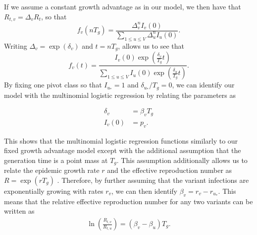 If we assume a constant growth advantage as in our model, we then have that $R_{t,v} = \Delta_{v} R_{t}$, so that
\begin{equation}
  f_{v}(nT_{g}) =  \frac{\Delta_{v}^{n} I_{v}(0)}{\sum_{1\leq u \leq V} \Delta_{u}^{n} I_{u}(0)}.
\end{equation}
Writing $\Delta_{v} = \exp(\delta_{v})$ and $t = n T_{g}$, allows us to see that
\begin{equation}
  f_{v}(t) = \frac{I_{v}(0) \exp(\frac{\delta_{v}}{T_{g}} t)}{\sum_{1\leq u \leq V}I_{u}(0) \exp(\frac{\delta_{u}}{T_{g}} t)}.
\end{equation}
By fixing one pivot class so that $I_{u_{*}} = 1$ and $\delta_{u_{*}} / T_{g} = 0$, we can identify our model with the multinomial logistic regression by relating the parameters as

\begin{align}
  \delta_{v} &= \beta_{v}T_{g}\\
  I_{v}(0) &= p_{v}.
\end{align}

This shows that the multinomial logistic regression functions similarly to our fixed growth advantage model except with the additional assumption that the generation time is a point mass at $T_{g}$.
This assumption additionally allows us to relate the epidemic growth rate $r$ and the effective reproduction number as $R = \exp(r T_{g})$ \cite{Wallinga2006}.
Therefore, by further assuming that the variant infections are exponentially growing with rates $r_{v}$, we can then identify $\beta_{v} = r_{v} - r_{u_{*}}$.
This means that the relative effective reproduction number for any two variants can be written as
\begin{align*}
\ln \left( \frac{R_{t,v}}{R_{t,u}} \right) = (\beta_{v} - \beta_{u}) T_{g}.
\end{align*}

